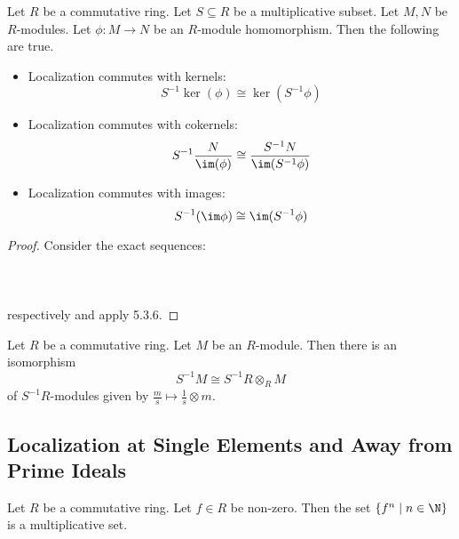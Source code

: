 \documentclass[a4paper]{article}
\begin{document}
\begin{lmm}{}{} Let $R$ be a commutative ring. Let $S\subseteq R$ be a multiplicative subset. Let $M,N$ be $R$-modules. Let $\phi:M\to N$ be an $R$-module homomorphism. Then the following are true. 
\begin{itemize}
\item Localization commutes with kernels: $$S^{-1}\ker(\phi)\cong\ker(S^{-1}\phi)$$
\item Localization commutes with cokernels: $$S^{-1}\frac{N}{\im(\phi)}\cong\frac{S^{-1}N}{\im(S^{-1}\phi)}$$
\item Localization commutes with images: $$S^{-1}(\im\phi)\cong\im(S^{-1}\phi)$$
\end{itemize} \tcbline
\begin{proof}
Consider the exact sequences: \\~\\
\\~\\
respectively and apply 5.3.6. 
\end{proof}
\end{lmm}

\begin{prp}{}{} Let $R$ be a commutative ring. Let $M$ be an $R$-module. Then there is an isomorphism $$S^{-1}M\cong S^{-1}R\otimes_RM$$ of $S^{-1}R$-modules given by $\frac{m}{s}\mapsto\frac{1}{s}\otimes m$. 
\end{prp}

\subsection{Localization at Single Elements and Away from Prime Ideals}
\begin{lmm}{}{} Let $R$ be a commutative ring. Let $f\in R$ be non-zero. Then the set $\{f^n\;|\;n\in\N\}$ is a multiplicative set. 
\end{lmm}
\end{document}
